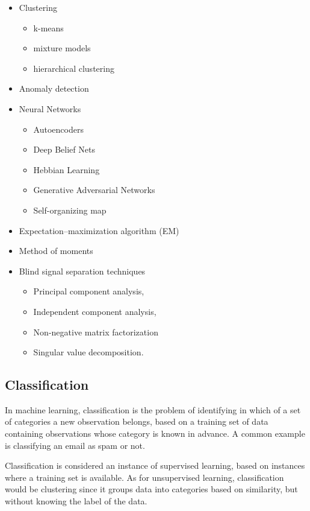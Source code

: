 \begin{itemize}[noitemsep]
	\item Clustering
	\begin{itemize}[noitemsep]
		\item k-means
		\item mixture models
		\item hierarchical clustering
	\end{itemize}
	\item Anomaly detection
	\item Neural Networks
	\begin{itemize}[noitemsep]
		\item Autoencoders
		\item Deep Belief Nets
		\item Hebbian Learning
		\item Generative Adversarial Networks
		\item Self-organizing map
	\end{itemize}
	\item Expectation–maximization algorithm (EM)
	\item Method of moments
	\item Blind signal separation techniques
	\begin{itemize}[noitemsep]
		\item Principal component analysis,
		\item Independent component analysis,
		\item Non-negative matrix factorization
		\item Singular value decomposition.
	\end{itemize}
\end{itemize}

\subsection{Classification} \label{classification}
In machine learning, classification is the problem of identifying in which of a set of categories a new observation belongs, based on a training set of data containing observations whose category is known in advance. A common example is classifying an email as spam or not.

Classification is considered an instance of supervised learning, based on instances where a training set is available. As for unsupervised learning, classification would be clustering since it groups data into categories based on similarity, but without knowing the label of the data.


